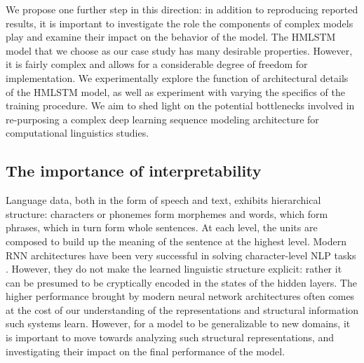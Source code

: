We propose one further step in this direction: in addition to reproducing 
reported results, it is important to investigate the role the components of  
complex models play and examine their impact on the behavior of the model.
%
The HMLSTM model that we choose as our case study has many desirable properties.
However, it is fairly complex and allows for a considerable degree of freedom 
for implementation. We experimentally explore the function of architectural details 
of the HMLSTM model, as well as experiment with varying the specifics of the 
training procedure. We aim to shed light on the potential bottlenecks involved in 
re-purposing a complex deep learning sequence modeling architecture for
computational linguistics studies. 



\subsection{The importance of interpretability}

Language data, both in the form of speech and text, exhibits
hierarchical structure: characters or phonemes form morphemes and
words, which form phrases, which in turn form whole sentences. At each
level, the units are composed to build up the meaning of the sentence
at the highest level. Modern RNN architectures have been very successful 
in solving character-level NLP tasks
\citep{chung2016character,golub2016character,mikolovsubword}.
However, they do not make the learned linguistic structure explicit:
rather it can be presumed to be cryptically encoded in the states of
the hidden layers.
%
The higher performance brought by modern neural network architectures often 
comes at the cost of our understanding of the representations and structural 
information such systems learn. However, for a model to be generalizable to new 
domains, it is important to move towards analyzing such structural representations, 
and investigating their impact on the final performance of the model.


